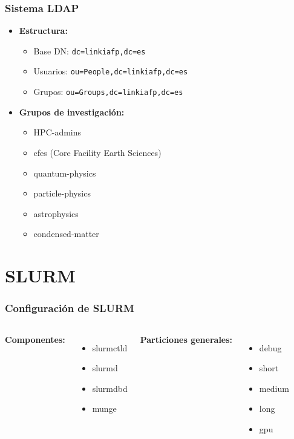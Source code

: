 \documentclass[aspectratio=169]{beamer}
\begin{document}
\begin{frame}
\frametitle{Sistema LDAP}
\begin{itemize}
    \item \textbf{Estructura:}
    \begin{itemize}
        \item Base DN: \texttt{dc=linkiafp,dc=es}
        \item Usuarios: \texttt{ou=People,dc=linkiafp,dc=es}
        \item Grupos: \texttt{ou=Groups,dc=linkiafp,dc=es}
    \end{itemize}
    \item \textbf{Grupos de investigación:}
    \begin{itemize}
        \item HPC-admins
        \item cfes (Core Facility Earth Sciences)
        \item quantum-physics
        \item particle-physics
        \item astrophysics
        \item condensed-matter
    \end{itemize}
\end{itemize}
\end{frame}

\section{SLURM}

\begin{frame}
\frametitle{Configuración de SLURM}
\begin{columns}
\textbf{Componentes:}
\begin{itemize}
    \item slurmctld
    \item slurmd
    \item slurmdbd
    \item munge
\end{itemize}

\textbf{Particiones generales:}
\begin{itemize}
    \item debug
    \item short
    \item medium
    \item long
    \item gpu
\end{itemize}
\end{columns}
\end{frame}
\end{document}
